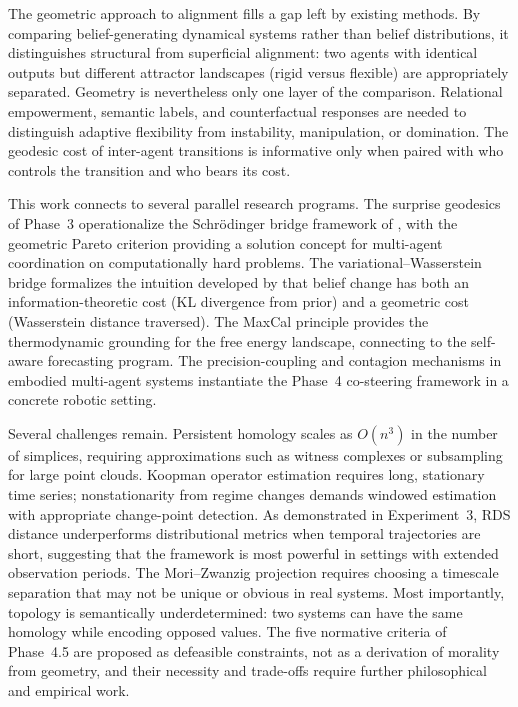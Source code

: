 \documentclass[11pt,a4paper]{article}
\theoremstyle{definition}
\begin{document}
The geometric approach to alignment fills a gap left by existing methods. By comparing belief-generating dynamical systems rather than belief distributions, it distinguishes structural from superficial alignment: two agents with identical outputs but different attractor landscapes (rigid versus flexible) are appropriately separated. Geometry is nevertheless only one layer of the comparison. Relational empowerment, semantic labels, and counterfactual responses are needed to distinguish adaptive flexibility from instability, manipulation, or domination. The geodesic cost of inter-agent transitions is informative only when paired with who controls the transition and who bears its cost.

This work connects to several parallel research programs. The surprise geodesics of Phase~3 operationalize the Schr\"{o}dinger bridge framework of \citet{goertzel2025judging}, with the geometric Pareto criterion providing a solution concept for multi-agent coordination on computationally hard problems. The variational--Wasserstein bridge formalizes the intuition developed by \citet{hyland2025variational} that belief change has both an information-theoretic cost (KL divergence from prior) and a geometric cost (Wasserstein distance traversed). The MaxCal principle \citep{sakthivadivel2025maxcal} provides the thermodynamic grounding for the free energy landscape, connecting to the self-aware forecasting program. The precision-coupling and contagion mechanisms in embodied multi-agent systems \citep{albarracin2024shared} instantiate the Phase~4 co-steering framework in a concrete robotic setting.

Several challenges remain. Persistent homology scales as $O(n^3)$ in the number of simplices, requiring approximations such as witness complexes or subsampling for large point clouds. Koopman operator estimation requires long, stationary time series; nonstationarity from regime changes demands windowed estimation with appropriate change-point detection. As demonstrated in Experiment~3, RDS distance underperforms distributional metrics when temporal trajectories are short, suggesting that the framework is most powerful in settings with extended observation periods. The Mori--Zwanzig projection requires choosing a timescale separation that may not be unique or obvious in real systems. Most importantly, topology is semantically underdetermined: two systems can have the same homology while encoding opposed values. The five normative criteria of Phase~4.5 are proposed as defeasible constraints, not as a derivation of morality from geometry, and their necessity and trade-offs require further philosophical and empirical work.
\end{document}
